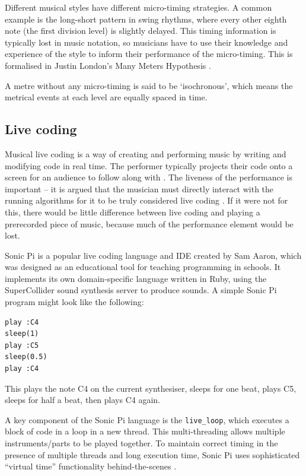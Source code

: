 \documentclass[12pt,twoside,openright]{report}
\begin{document}
Different
musical styles have different micro-timing strategies. A common example is the
long-short pattern in swing rhythms, where every other eighth note (the first
division level) is slightly delayed. This timing information is typically lost
in music notation, so musicians have to use
their knowledge and experience of the style to inform their performance of the
micro-timing. This is formalised in Justin London's Many Meters Hypothesis
\cite{london2012}.

A metre without any micro-timing is said to be `isochronous',
which means the metrical events at each level are equally spaced in time.


\subsection{Live coding} \label{live_coding_background}

Musical live coding is a way of creating and performing music by writing and
modifying code in real time. The performer typically projects their code onto a
screen for an audience to follow along with \cite{magnusson2011}. The liveness of the
performance is important -- it is argued that the musician must directly
interact with the running algorithms for it to be truly considered live coding
\cite{collins2011}. If it were not for this, there would be little difference between live coding and playing a prerecorded piece of music, because much of the performance element would be lost.

Sonic Pi \cite{aaron2013} is a popular live coding language and IDE created by Sam Aaron, which
was designed as an educational tool for teaching programming in schools. It
implements its own domain-specific language written in Ruby, using the
SuperCollider sound synthesis server to produce sounds. A simple
Sonic Pi program might look like the following:

\begin{verbatim}
play :C4
sleep(1)
play :C5
sleep(0.5)
play :C4
\end{verbatim}

This plays the note C4 on the current synthesiser, sleeps for one beat, plays C5,
sleeps for half a beat, then plays C4 again.

A key component of the Sonic Pi language is the \verb'live_loop', which executes a
block of code in a loop in a new thread. This multi-threading allows multiple instruments/parts to be played together. To maintain correct timing in the presence
of multiple threads and long execution time, Sonic Pi uses sophisticated
``virtual time'' functionality behind-the-scenes \cite{aaron2014}.
\end{document}
